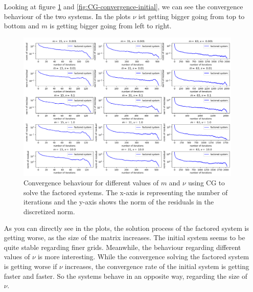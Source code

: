 \documentclass{amsart}
\theoremstyle{definition}
\theoremstyle{remark}
\numberwithin{equation}{section}
\begin{document}
Looking at figure \ref{fig:CG-convergence-factored} and \ref{fig:CG-convergence-initial}, we can see the  convergence behaviour of the two systems. In the plots $\nu$ ist getting bigger going from top to bottom and $m$ is getting bigger going from left to right.
\begin{figure}[h!]
\centering
\includegraphics[scale=0.52]{./imgs/CG_analysis_factored}
\caption{Convergence behaviour for different values of $m$ and $\nu$ using CG to solve the factored systems.
The x-axis is representing the number of iterations and the y-axis shows the norm of the residuals in the discretized norm.}
\label{fig:CG-convergence-factored}
\end{figure}
As you can directly see in the plots, the solution process of the factored system is getting worse, as the size of the matrix increases. The initial
system seems to be quite stable regarding finer grids. Meanwhile, the behaviour  regarding different values of $\nu$ is more interesting. While the 
convergence solving the factored system is getting worse if 
$\nu$ increases, the convergence rate of the initial system is getting faster and faster. So the systems behave in an opposite way, regarding the size of 
$\nu$.
\end{document}
